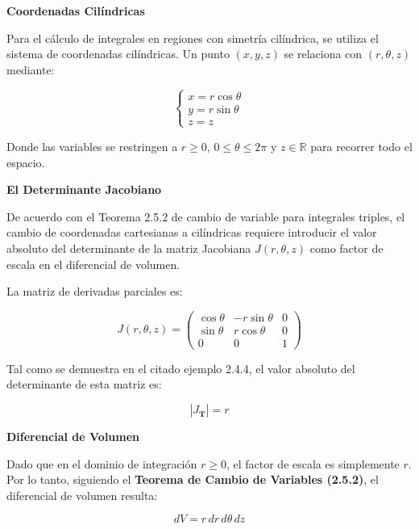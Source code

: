 
\noindent\textbf{Coordenadas Cilíndricas}
\vspace{0.2cm}

Para el cálculo de integrales en regiones con simetría cilíndrica, se utiliza el sistema de coordenadas cilíndricas. Un punto $(x, y, z)$ se relaciona con $(r, \theta, z)$ mediante:

\begin{equation}
\begin{cases} 
x = r \cos \theta \\ 
y = r \sin \theta \\ 
z = z 
\end{cases}
\end{equation}

Donde las variables se restringen a $r \ge 0$, $0 \le \theta \le 2\pi$ y $z \in \mathbb{R}$ para recorrer todo el espacio.

\vspace{0.4cm}
\noindent\textbf{El Determinante Jacobiano}

De acuerdo con el Teorema 2.5.2 de cambio de variable para integrales triples, el cambio de coordenadas cartesianas a cilíndricas requiere introducir el valor absoluto del determinante de la matriz Jacobiana $J(r, \theta, z)$ como factor de escala en el diferencial de volumen.

La matriz de derivadas parciales es:

\begin{equation}
J(r, \theta, z) = 
\begin{pmatrix} 
\cos \theta & -r \sin \theta & 0 \\ 
\sin \theta & r \cos \theta & 0 \\ 
0 & 0 & 1 
\end{pmatrix}
\end{equation}

Tal como se demuestra en el citado ejemplo 2.4.4, el valor absoluto del determinante de esta matriz es:

\begin{equation}
|J_{\mathbf{T}}| = r
\end{equation}

\vspace{0.4cm}
\noindent\textbf{Diferencial de Volumen}

Dado que en el dominio de integración $r \ge 0$, el factor de escala es simplemente $r$. Por lo tanto, siguiendo el \textbf{Teorema de Cambio de Variables (2.5.2)}, el diferencial de volumen resulta:

\begin{equation}
dV = r \, dr \, d\theta \, dz
\end{equation}